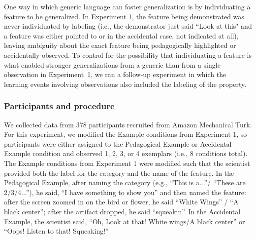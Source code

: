 \documentclass[10pt,letterpaper]{article}
\newcommand{\soph}[1]{\textcolor{Green}{[sb: #1]}}
\begin{document}
One way in which generic language can foster generalization is by individuating a feature to be generalized. 
In Experiment 1, the feature being demonstrated was never individuated by labeling (i.e., the demonstrator just said ``Look at this" and a feature was either pointed to or in the accidental case, not indicated at all), leaving ambiguity about the exact feature being pedagogically highlighted or accidentally observed. 
To control for the possibility that individuating a feature is what enabled stronger generalizations from a generic than from a single observation in Experiment~1, we ran a follow-up experiment in which the learning events involving observations also included the labeling of the property. 

\subsubsection{Participants and procedure}

We collected data from 378 participants recruited from Amazon Mechanical Turk.
For this experiment, we modified the Example conditions from Experiment 1, so participants were either assigned to the Pedagogical Example or Accidental Example condition and observed 1, 2, 3, or 4 exemplars (i.e., 8 conditions total). 
The Example conditions from Experiment 1 were modified such that the scientist provided both the label for the category and the name of the feature. 
In the Pedagogical Example, after naming the category (e.g., ``This is a...''/ ``These are 2/3/4...''), he said, ``I have something to show you'' and then named the feature: after the screen zoomed in on the bird or flower, he said ``White Wings'' / ``A black center''; after the artifact dropped, he said ``squeakin''.
In the Accidental Example, the scientist said, ``Oh, Look at that! White wings/A black center'' or ``Oops! Listen to that! Squeaking!'' 
\end{document}
